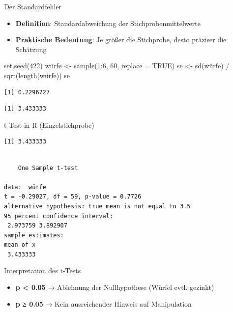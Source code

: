 \documentclass[
  ignorenonframetext,
]{beamer}
\newenvironment{Shaded}{\begin{snugshade}}{\end{snugshade}}
\newcommand{\AttributeTok}[1]{\textcolor[rgb]{0.40,0.45,0.13}{#1}}
\newcommand{\ConstantTok}[1]{\textcolor[rgb]{0.56,0.35,0.01}{#1}}
\newcommand{\DecValTok}[1]{\textcolor[rgb]{0.68,0.00,0.00}{#1}}
\newcommand{\FunctionTok}[1]{\textcolor[rgb]{0.28,0.35,0.67}{#1}}
\newcommand{\NormalTok}[1]{\textcolor[rgb]{0.00,0.23,0.31}{#1}}
\newcommand{\OtherTok}[1]{\textcolor[rgb]{0.00,0.23,0.31}{#1}}
\newcommand{\SpecialCharTok}[1]{\textcolor[rgb]{0.37,0.37,0.37}{#1}}
\providecommand{\tightlist}{%
  \setlength{\itemsep}{0pt}\setlength{\parskip}{0pt}}
\begin{document}
\begin{frame}[fragile]{Der Standardfehler}
\protect{}\label{der-standardfehler}
\begin{itemize}
\tightlist
\item
  \textbf{Definition}: Standardabweichung der Stichprobenmittelwerte
\item
  \textbf{Praktische Bedeutung}: Je größer die Stichprobe, desto
  präziser die Schätzung
\end{itemize}

\begin{Shaded}
\begin{Highlighting}[]
\FunctionTok{set.seed}\NormalTok{(}\DecValTok{422}\NormalTok{)}
\NormalTok{würfe }\OtherTok{\textless{}{-}} \FunctionTok{sample}\NormalTok{(}\DecValTok{1}\SpecialCharTok{:}\DecValTok{6}\NormalTok{, }\DecValTok{60}\NormalTok{, }\AttributeTok{replace =} \ConstantTok{TRUE}\NormalTok{)}
\NormalTok{se }\OtherTok{\textless{}{-}} \FunctionTok{sd}\NormalTok{(würfe) }\SpecialCharTok{/} \FunctionTok{sqrt}\NormalTok{(}\FunctionTok{length}\NormalTok{(würfe))}
\NormalTok{se}
\end{Highlighting}
\end{Shaded}

\begin{verbatim}
[1] 0.2296727
\end{verbatim}

\begin{verbatim}
[1] 3.433333
\end{verbatim}
\end{frame}

\begin{frame}[fragile]{t-Test in R (Einzelstichprobe)}
\protect{}\label{t-test-in-r-einzelstichprobe}
\begin{verbatim}
[1] 3.433333
\end{verbatim}

\begin{verbatim}

    One Sample t-test

data:  würfe
t = -0.29027, df = 59, p-value = 0.7726
alternative hypothesis: true mean is not equal to 3.5
95 percent confidence interval:
 2.973759 3.892907
sample estimates:
mean of x 
 3.433333 
\end{verbatim}
\end{frame}

\begin{frame}{Interpretation des t-Tests}
\protect{}\label{interpretation-des-t-tests}
\begin{itemize}
\tightlist
\item
  \textbf{p \textless{} 0.05} → Ablehnung der Nullhypothese (Würfel
  evtl. gezinkt)
\item
  \textbf{p ≥ 0.05} → Kein ausreichender Hinweis auf Manipulation
\end{itemize}
\end{frame}
\end{document}
